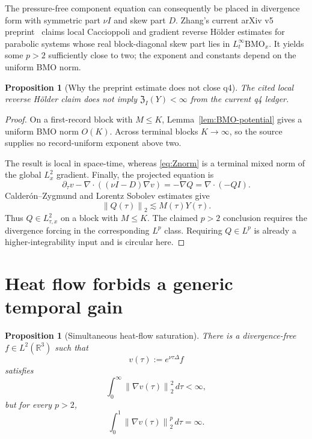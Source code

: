 \documentclass[11pt]{article}
\newtheorem{proposition}[theorem]{Proposition}
\theoremstyle{remark}
\newcommand{\R}{\mathbb R}
\newcommand{\norm}[1]{\left\|#1\right\|}
\newcommand{\cZ}{\mathfrak Z}
\begin{document}
The pressure-free component equation can consequently be placed in
divergence form with symmetric part \(\nu I\) and skew part \(D\).
Zhang's current arXiv v5 preprint~\cite{ZhangBMO} claims local
Caccioppoli and gradient reverse H\"older estimates for parabolic
systems whose real block-diagonal skew part lies in
\(L^\infty_t\mathrm{BMO}_x\).  It yields some \(p>2\) sufficiently
close to two; the exponent and constants depend on the uniform BMO
norm.

\begin{proposition}[Why the preprint estimate does not close q4]
\label{prop:BMO-mismatch}
The cited local reverse H\"older claim does not imply
\(\cZ_I(Y)<\infty\) from the current q4 ledger.
\end{proposition}

\begin{proof}
On a first-record block with \(M\leq K\),
Lemma~\ref{lem:BMO-potential} gives a uniform BMO norm \(O(K)\).
Across terminal blocks \(K\to\infty\), so the source supplies no
record-uniform exponent above two.

The result is local in space-time, whereas \eqref{eq:Znorm} is a
terminal mixed norm of the global \(L_x^2\) gradient.  Finally, the
projected equation is
\begin{equation}
\label{eq:pressure-forcing}
 \partial_\tau v
 -\nabla\cdot((\nu I-D)\nabla v)
 =
 -\nabla Q
 =
 \nabla\cdot(-QI).
\end{equation}
Calder\'on--Zygmund and Lorentz Sobolev estimates give
\begin{equation}
\label{eq:Qbase}
 \norm{Q(\tau)}_2
 \lesssim
 M(\tau)Y(\tau).
\end{equation}
Thus \(Q\in L^2_{\tau,x}\) on a block with \(M\leq K\).  The claimed
\(p>2\) conclusion requires the divergence forcing in the corresponding
\(L^p\) class.  Requiring \(Q\in L^p\) is already a
higher-integrability input and is circular here.
\end{proof}

\section{Heat flow forbids a generic temporal gain}

\begin{proposition}[Simultaneous heat-flow saturation]
\label{prop:heat}
There is a divergence-free \(f\in L^2(\R^3)\) such that
\[
 v(\tau):=e^{\nu\tau\Delta}f
\]
satisfies
\begin{equation}
\label{eq:heat-energy}
 \int_0^\infty\norm{\nabla v(\tau)}_2^2\,d\tau<\infty,
\end{equation}
but for every \(p>2\),
\begin{equation}
\label{eq:heat-no-p}
 \int_0^1\norm{\nabla v(\tau)}_2^p\,d\tau=\infty.
\end{equation}
\end{proposition}
\end{document}
